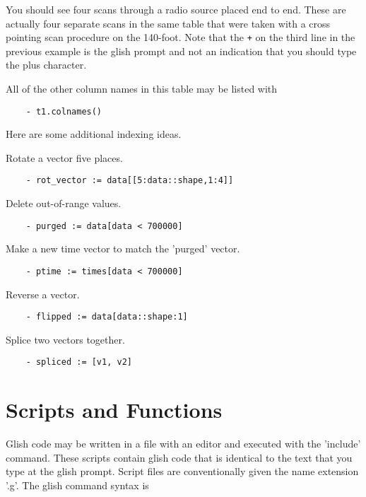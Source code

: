 You should see four scans through a radio source placed end to end.  These
are actually four separate scans in the same table that were taken with a
cross pointing scan procedure on the 140-foot.  Note that the \verb!+!
on the third line in the previous example is the glish prompt
and not an indication that you should type the plus character.

    All of the other column names in this table may be listed with

\begin{verbatim}
	- t1.colnames()
\end{verbatim}

    Here are some additional indexing ideas.

Rotate a vector five places.

\begin{verbatim}
	- rot_vector := data[[5:data::shape,1:4]]
\end{verbatim}

Delete out-of-range values.

\begin{verbatim}
	- purged := data[data < 700000]
\end{verbatim}

Make a new time vector to match the 'purged' vector.

\begin{verbatim}
	- ptime := times[data < 700000]
\end{verbatim}

Reverse a vector.

\begin{verbatim}
	- flipped := data[data::shape:1]
\end{verbatim}

Splice two vectors together.

\begin{verbatim}
	- spliced := [v1, v2]
\end{verbatim}

\section{Scripts and Functions}

    Glish code may be written in a file with an editor and executed with
the 'include' command.  These scripts contain glish code that is identical
to the text that you type at the glish prompt.  Script files are
conventionally given the name extension '.g'.  The glish command syntax is


